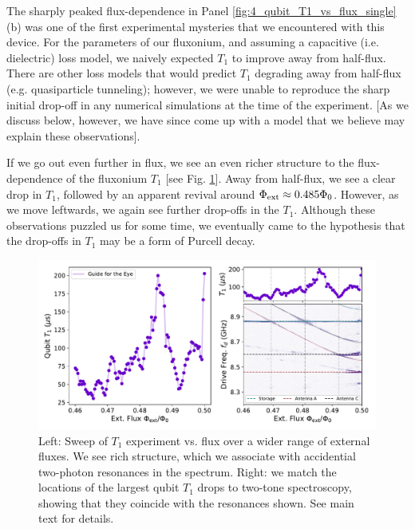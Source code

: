 The sharply peaked flux-dependence in Panel \ref{fig:4_qubit_T1_vs_flux_single}(b) was one of the first experimental mysteries that we encountered with this device. For the parameters of our fluxonium, and assuming a capacitive (i.e. dielectric) loss model, we naively expected $T_1$ to improve away from half-flux. There are other loss models that would predict $T_1$ degrading away from half-flux (e.g. quasiparticle tunneling); however, we were unable to reproduce the sharp initial drop-off in any numerical simulations at the time of the experiment. [As we discuss below, however, we have since come up with a model that we believe may explain these observations]. 

If we go out even further in flux, we see an even richer structure to the flux-dependence of the fluxonium $T_1$ [see Fig. \ref{fig:4_qubit_T1_vs_flux_spec}]. Away from half-flux, we see a clear drop in $T_1$, followed by an apparent revival around $\Phi_{\rm ext} \approx 0.485\Phi_0$. However, as we move leftwards, we again see further drop-offs in the $T_1$. Although these observations puzzled us for some time, we eventually came to the hypothesis that the drop-offs in $T_1$ may be a form of Purcell decay.

\begin{figure}[h]
    \centering
    \includegraphics[width=0.95\linewidth]{Figures/4/qubit_T1_vs_flux_spec.pdf}
    \caption{Left: Sweep of $T_1$ experiment vs. flux over a wider range of external fluxes. We see rich structure, which we associate with accidential two-photon resonances in the spectrum. Right: we match the locations of the largest qubit $T_1$ drops to two-tone spectroscopy, showing that they coincide with the resonances shown. See main text for details.}
    \label{fig:4_qubit_T1_vs_flux_spec}
\end{figure}

